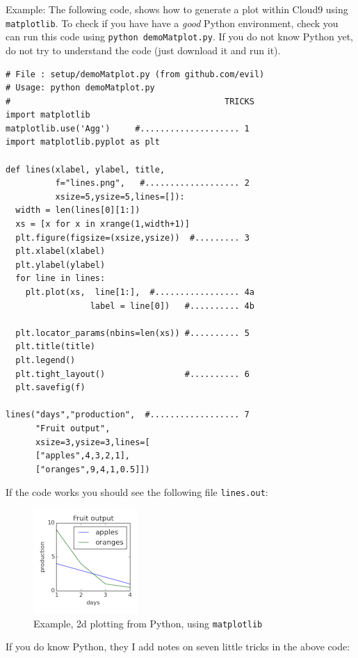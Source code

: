 Example: The following code, shows how to generate a plot within Cloud9
using \texttt{matplotlib}. To check if you have have a \emph{good}
Python environment, check you can run this code using
\texttt{python\ demoMatplot.py}. If you do not know Python yet, do not
try to understand the code (just download it and run it).

\newpage

\begin{lstlisting}
# File : setup/demoMatplot.py (from github.com/evil)
# Usage: python demoMatplot.py              
#                                           TRICKS
import matplotlib
matplotlib.use('Agg')     #.................... 1
import matplotlib.pyplot as plt 

def lines(xlabel, ylabel, title,
          f="lines.png",   #................... 2
          xsize=5,ysize=5,lines=[]): 
  width = len(lines[0][1:])
  xs = [x for x in xrange(1,width+1)] 
  plt.figure(figsize=(xsize,ysize))  #......... 3
  plt.xlabel(xlabel)
  plt.ylabel(ylabel) 
  for line in lines: 
    plt.plot(xs,  line[1:],  #................. 4a
                 label = line[0])   #.......... 4b
   
  plt.locator_params(nbins=len(xs)) #.......... 5
  plt.title(title)
  plt.legend()
  plt.tight_layout()                #.......... 6
  plt.savefig(f)

lines("days","production",  #.................. 7
      "Fruit output",
      xsize=3,ysize=3,lines=[
      ["apples",4,3,2,1],
      ["oranges",9,4,1,0.5]])
\end{lstlisting}

If the code works you should see the following file \texttt{lines.out}:

\begin{figure}[htbp]
\centering
\includegraphics{img/matplotlib101.png}
\caption{Example, 2d plotting from Python, using \texttt{matplotlib}}
\end{figure}

If you do know Python, they I add notes on seven little tricks in the
above code:

